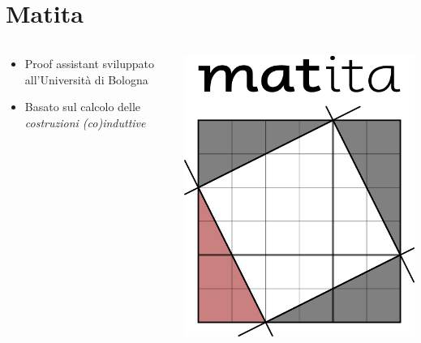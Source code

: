 \documentclass{beamer}
\begin{document}
\section{Matita}
\begin{frame}
\begin{columns}
  \begin{column}{.5\textwidth}
    \begin{itemize}
      \item Proof assistant sviluppato all'Università di Bologna
      \vspace{1.5em}
      \item Basato sul calcolo delle \textit{costruzioni (co)induttive}
    \end{itemize}
  \end{column}
  \begin{column}{.5\textwidth}
    \includegraphics[scale=0.30]{matita.png}
  \end{column}
\end{columns}
\end{frame}
\end{document}
